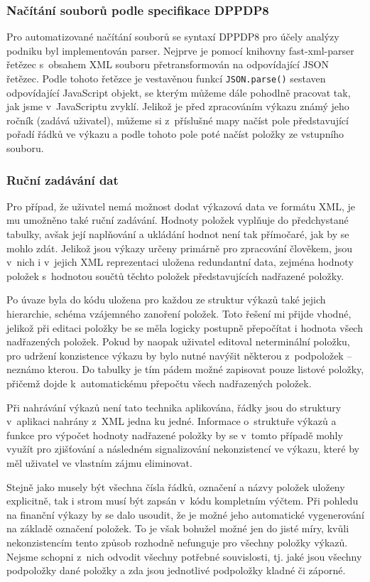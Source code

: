 \subsubsection{Načítání souborů podle specifikace DPPDP8}
Pro automatizované načítání souborů se syntaxí DPPDP8 pro účely analýzy podniku byl implementován parser. Nejprve je pomocí knihovny fast-xml-parser řetězec s~obsahem XML souboru přetransformován na odpovídající JSON řetězec. Podle tohoto řetězce je vestavěnou funkcí \texttt{JSON.parse()} sestaven odpovídající JavaScript objekt, se kterým můžeme dále pohodlně pracovat tak, jak jsme v~JavaScriptu zvyklí. Jelikož je před zpracováním výkazu známý jeho ročník (zadává uživatel), můžeme si z~příslušné mapy načíst pole představující pořadí řádků ve výkazu a podle tohoto pole poté načíst položky ze vstupního souboru.


\subsubsection{Ruční zadávání dat}
Pro případ, že uživatel nemá možnost dodat výkazová data ve formátu XML, je mu umožněno také ruční zadávání. Hodnoty položek vyplňuje do předchystané tabulky, avšak její naplňování a ukládání hodnot není tak přímočaré, jak by se mohlo zdát. Jelikož jsou výkazy určeny primárně pro zpracování člověkem, jsou v~nich i v~jejich XML reprezentaci uložena redundantní data, zejména hodnoty položek s~hodnotou součtů těchto položek představujících nadřazené položky. 

Po úvaze byla do kódu uložena pro každou ze struktur výkazů také jejich hierarchie, schéma vzájemného zanoření položek. Toto řešení mi přijde vhodné, jelikož při editaci položky be se měla logicky postupně přepočítat i hodnota všech nadřazených položek. Pokud by naopak uživatel editoval neterminální položku, pro udržení konzistence výkazu by bylo nutné navýšit některou z~podpoložek -- neznámo kterou. Do tabulky je tím pádem možné zapisovat pouze listové položky, přičemž dojde k~automatickému přepočtu všech nadřazených položek.

Při nahrávání výkazů není tato technika aplikována, řádky jsou do struktury v~aplikaci nahrány z~XML jedna ku jedné. Informace o~struktuře výkazů a funkce pro výpočet hodnoty nadřazené položky by se v~tomto případě mohly využít pro zjišťování a následném signalizování nekonzistencí ve výkazu, které by měl uživatel ve vlastním zájmu eliminovat.

Stejně jako musely být všechna čísla řádků, označení a názvy položek uloženy explicitně, tak i strom musí být zapsán v~kódu kompletním výčtem. Při pohledu na finanční výkazy by se dalo usoudit, že je možné jeho automatické vygenerování na základě označení položek. To je však bohužel možné jen do jisté míry, kvůli nekonzistencím tento způsob rozhodně nefunguje pro všechny položky výkazů. Nejsme schopni z~nich odvodit všechny potřebné souvislosti, tj. jaké jsou všechny podpoložky dané položky a zda jsou jednotlivé podpoložky kladné či záporné.


